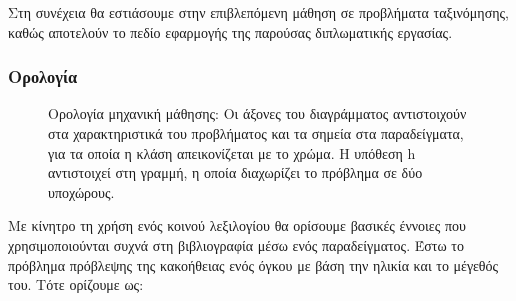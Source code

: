 Στη συνέχεια θα εστιάσουμε στην επιβλεπόμενη μάθηση σε προβλήματα ταξινόμησης, καθώς αποτελούν το πεδίο εφαρμογής της παρούσας διπλωματικής εργασίας.
 
\subsubsection{Ορολογία} \label{section:terminology}
\begin{figure}
	\centering
\caption[Χώρος χαρακτηριστικών προβλήματος ταξινόμησης όγκων ως προς κακοήθεια]{Ορολογία μηχανική μάθησης: Οι άξονες του διαγράμματος αντιστοιχούν στα χαρακτηριστικά του προβλήματος και τα σημεία στα παραδείγματα, για τα οποία η κλάση απεικονίζεται με το χρώμα. Η υπόθεση h αντιστοιχεί στη γραμμή, η οποία διαχωρίζει το πρόβλημα σε δύο υποχώρους.}	
\end{figure}
 Με κίνητρο τη χρήση ενός κοινού λεξιλογίου θα ορίσουμε βασικές έννοιες που χρησιμοποιούνται συχνά στη βιβλιογραφία μέσω ενός παραδείγματος. Έστω το πρόβλημα πρόβλεψης της κακοήθειας ενός όγκου με βάση την ηλικία και το μέγεθός του. Τότε ορίζουμε ως:
